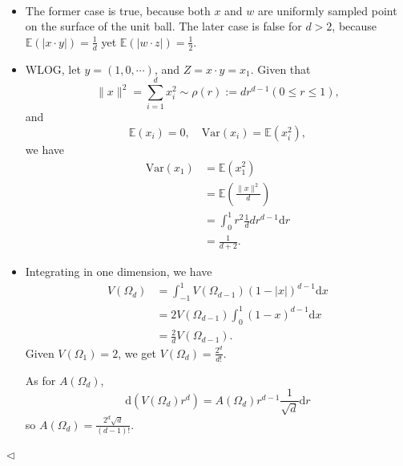 ﻿\documentclass[11pt]{article}
\newenvironment{answer}[1][Answer]{\begin{trivlist}
\item[\hskip \labelsep {\bfseries #1.}\hskip \labelsep]}{\hfill$\lhd$\end{trivlist}}
\begin{document}
\begin{answer} ~
\begin{itemize}
    \item [(1)] The former case is true, because both $x$ and $w$ are uniformly sampled point on the surface of the unit ball. The later case is false for $d>2$, because $\mathbb{E}(|x\cdot y|)=\frac{1}{d}$ yet $\mathbb{E}(|w\cdot z|)=\frac{1}{2}$.
    \item [(2)] WLOG, let $y=(1,0,\cdots)$, and $Z=x\cdot y=x_1$. Given that
        $$
            \|x\|^2 = \sum_{i=1}^d x_i^2 \sim \rho(r):= d r^{d-1} (0\le r\le 1),
        $$
        and
        $$
            \mathbb{E}(x_i) = 0,\quad \mathrm{Var}(x_i)=\mathbb{E}(x_i^2),
        $$
        we have
        $$
            \begin{aligned}
                \mathrm{Var}(x_1) &= \mathbb{E}(x_1^2)\\
                &= \mathbb{E}\left(\frac{\|x\|^2}{d}\right)\\
                &= \int_0^1 r^2\frac{1}{d}d r^{d-1}\mathrm{d}r\\
                &= \frac{1}{d+2}.
            \end{aligned}
        $$
    \item [(3)] Integrating in one dimension, we have
        $$
            \begin{aligned}
                V(\Omega_d) &= \int_{-1}^1 V(\Omega_{d-1})(1-|x|)^{d-1}\mathrm{d}x\\
                &= 2V(\Omega_{d-1})\int_0^1(1-x)^{d-1}\mathrm{d}x\\
                &= \frac{2}{d}V(\Omega_{d-1}).
            \end{aligned}
        $$
        Given $V(\Omega_1)=2$, we get $V(\Omega_d)=\frac{2^d}{d!}$.

        As for $A(\Omega_d)$,
        $$
            \mathrm{d}\left(V(\Omega_d)r^d\right) = A(\Omega_d)r^{d-1}\frac{1}{\sqrt{d}}\mathrm{d}r
        $$
        so $A(\Omega_d)=\frac{2^d\sqrt{d}}{(d-1)!}$.
\end{itemize}
\end{answer}
\end{document}

